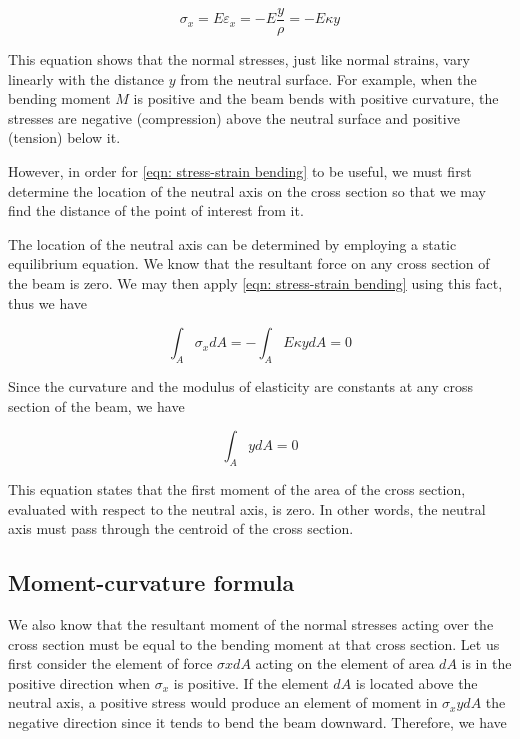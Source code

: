 \documentclass[
10pt,
a4paper,
openany,
svgnames,
]{book}
\begin{document}
\begin{equation} \label{eqn: stress-strain bending}
  \sigma_x = E\varepsilon_x =  - E\frac{y}{\rho } =  - E\kappa y
\end{equation}

This equation shows that the normal stresses, just like normal strains, vary linearly with the distance $y$ from the neutral surface. For example, when the bending moment $M$ is positive and the beam bends with positive curvature, the stresses are negative (compression) above the neutral surface and positive (tension) below it.

However, in order for \cref{eqn: stress-strain bending} to be useful, we must first determine the location of the neutral axis on the cross section so that we may find the distance of the point of interest from it.

The location of the neutral axis can be determined by employing a static equilibrium equation. We know that the resultant force on any cross section of the beam is zero. We may then apply \cref{eqn: stress-strain bending} using this fact, thus we have

\[\int_A\sigma_x dA  =  - \int_A E\kappa ydA  = 0\]

Since the curvature and the modulus of elasticity are constants at any cross section of the beam, we have

\begin{equation}
  \int_A ydA = 0
\end{equation}

This equation states that the first moment of the area of the cross section, evaluated with respect to the neutral axis, is zero. In other words, the neutral axis must pass through the centroid of the cross section.

\subsection{Moment-curvature formula}

We also know that the resultant moment of the normal stresses acting over the
cross section must be equal to the bending moment at that cross section. Let us
first consider the element of force $\sigma xdA$ acting on the element of area
$dA$ is in the positive direction when $\sigma_x$ is positive. If the element $dA$ is located above the neutral axis, a positive stress would produce an
element of moment in $\sigma_xydA$ the negative direction since it tends to bend
the beam downward. Therefore, we have
\end{document}
